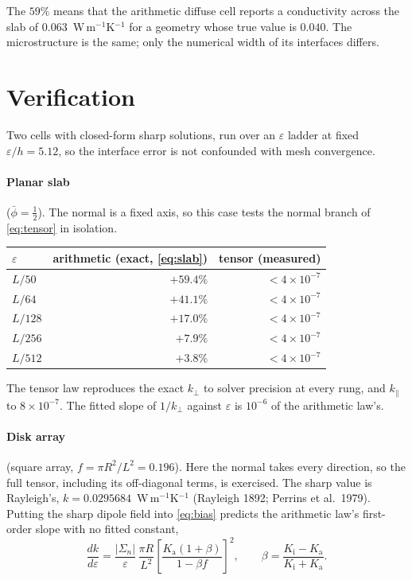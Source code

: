 \documentclass[11pt]{article}
\newcommand{\Ka}{K_{\mathrm a}}
\newcommand{\Ki}{K_{\mathrm i}}
\begin{document}
\noindent The $59\%$ means that the arithmetic diffuse cell reports a
conductivity across the slab of $0.063$~W\,m$^{-1}$K$^{-1}$ for a geometry whose
true value is $0.040$. The microstructure is the same; only the numerical width
of its interfaces differs.

\section{Verification}
\label{sec:verify}

Two cells with closed-form sharp solutions, run over an $\varepsilon$ ladder at
fixed $\varepsilon/h=5.12$, so the interface error is not confounded with mesh
convergence.

\paragraph{Planar slab} ($\bar\phi=\tfrac12$). The normal is a fixed axis,
so this case tests the normal branch of \eqref{eq:tensor} in isolation.

\begin{center}
\begin{tabular}{@{}lrr@{}}
\toprule
$\varepsilon$ & arithmetic (exact, \eqref{eq:slab}) & tensor (measured)\\
\midrule
$L/50$  & $+59.4\%$ & $<4\times10^{-7}$\\
$L/64$  & $+41.1\%$ & $<4\times10^{-7}$\\
$L/128$ & $+17.0\%$ & $<4\times10^{-7}$\\
$L/256$ & $+7.9\%$  & $<4\times10^{-7}$\\
$L/512$ & $+3.8\%$  & $<4\times10^{-7}$\\
\bottomrule
\end{tabular}
\end{center}

\noindent The tensor law reproduces the exact $k_\perp$ to solver precision at
every rung, and $k_\parallel$ to $8\times10^{-7}$. The fitted slope of $1/k_\perp$
against $\varepsilon$ is $10^{-6}$ of the arithmetic law's.

\paragraph{Disk array} (square array, $f=\pi R^2/L^2=0.196$). Here the normal
takes every direction, so the full tensor, including its off-diagonal terms, is
exercised. The sharp value is Rayleigh's, $k=0.0295684$~W\,m$^{-1}$K$^{-1}$
(Rayleigh 1892; Perrins et al.\ 1979). Putting the sharp dipole field into
\eqref{eq:bias} predicts the arithmetic law's first-order slope with no fitted
constant,
\begin{equation}
\frac{dk}{d\varepsilon}=\frac{|\Sigma_n|}{\varepsilon}\,\frac{\pi R}{L^2}
\left[\frac{\Ka(1+\beta)}{1-\beta f}\right]^2,\qquad
\beta=\frac{\Ki-\Ka}{\Ki+\Ka}.
\label{eq:diskslope}
\end{equation}
\end{document}
